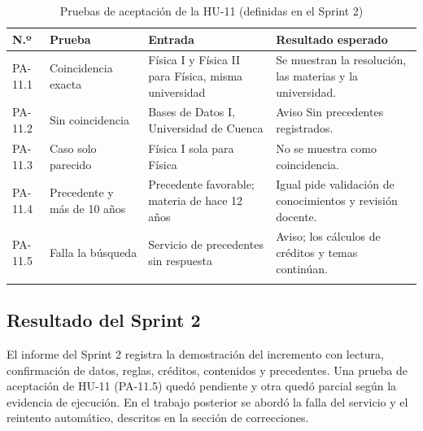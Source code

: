 \begin{longtable}{|p{1.4cm}|p{3.7cm}|p{4.6cm}|p{5.1cm}|}
\hline\rowcolor{grisTarjeta}\textbf{N.º} & \textbf{Prueba} & \textbf{Entrada} & \textbf{Resultado esperado}\\\hline
\endhead
PA-11.1 & Coincidencia exacta & Física I y Física II para Física, misma universidad & Se muestran la resolución, las materias y la universidad.\\\hline
PA-11.2 & Sin coincidencia & Bases de Datos I, Universidad de Cuenca & Aviso Sin precedentes registrados.\\\hline
PA-11.3 & Caso solo parecido & Física I sola para Física & No se muestra como coincidencia.\\\hline
PA-11.4 & Precedente y más de 10 años & Precedente favorable; materia de hace 12 años & Igual pide validación de conocimientos y revisión docente.\\\hline
PA-11.5 & Falla la búsqueda & Servicio de precedentes sin respuesta & Aviso; los cálculos de créditos y temas continúan.\\\hline
\caption{Pruebas de aceptación de la HU-11 (definidas en el Sprint 2)}
\end{longtable}


\subsection{Resultado del Sprint 2}
El informe del Sprint 2 registra la demostración del incremento con lectura, confirmación de datos, reglas, créditos, contenidos y precedentes. Una prueba de aceptación de HU-11 (PA-11.5) quedó pendiente y otra quedó parcial según la evidencia de ejecución. En el trabajo posterior se abordó la falla del servicio y el reintento automático, descritos en la sección de correcciones.
